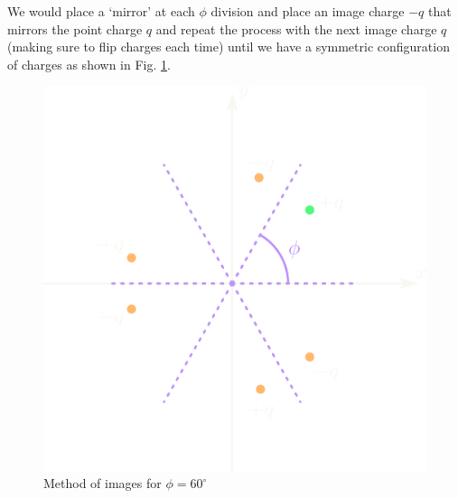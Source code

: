 \documentclass[../main.tex]{subfiles}
\begin{document}
We would place a `mirror' at each $\phi$ division and place an image charge $-q$ that mirrors the point charge $q$ and repeat
the process with the next image charge $q$ (making sure to flip charges each time) until we have a symmetric configuration of charges as shown in Fig. \ref{fig:3.15c}.
\begin{figure} [ht]
    \centering
    \includegraphics[width=0.5\linewidth]{hw3_15c.png}
    \caption{Method of images for $\phi = 60^\circ$}
    \label{fig:3.15c}
\end{figure}
\end{document}

